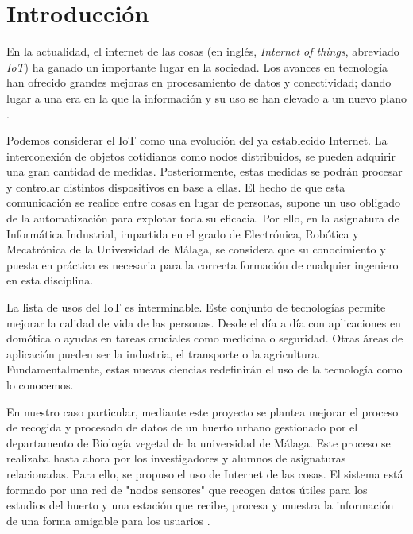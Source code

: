 \section{Introducción}\label{sec:introduccion}
En la actualidad, el internet de las cosas (en inglés, \textit{Internet of things}, abreviado \textit{IoT}) ha ganado un importante lugar en la sociedad. Los avances en tecnología han ofrecido grandes mejoras en procesamiento de datos y conectividad; dando lugar a una era en la que la información y su uso se han elevado a un nuevo plano \parencite{cisco:idc}.

Podemos considerar el IoT como una evolución del ya establecido Internet. La interconexión de objetos cotidianos como nodos distribuidos, se pueden adquirir una gran cantidad de medidas. Posteriormente, estas medidas se podrán procesar y controlar distintos dispositivos en base a ellas. El hecho de que esta comunicación se realice entre cosas en lugar de personas, supone un uso obligado de la automatización para explotar toda su eficacia. Por ello, en la asignatura de Informática Industrial, impartida en el grado de Electrónica, Robótica y Mecatrónica de la Universidad de Málaga, se considera que su conocimiento y puesta en práctica es necesaria para la correcta formación de cualquier ingeniero en esta disciplina.

La lista de usos del IoT es interminable. Este conjunto de tecnologías permite mejorar la calidad de vida de las personas. Desde el día a día con aplicaciones en domótica o ayudas en tareas cruciales como medicina o seguridad. Otras áreas de aplicación pueden ser la industria, el transporte o la agricultura. Fundamentalmente, estas nuevas ciencias redefinirán el uso de la tecnología como lo conocemos.

En nuestro caso particular, mediante este proyecto se plantea mejorar el proceso de recogida y procesado de datos de un huerto urbano gestionado por el departamento de Biología vegetal de la universidad de Málaga. Este proceso se realizaba hasta ahora por los investigadores y alumnos de asignaturas relacionadas. Para ello, se propuso el uso de Internet de las cosas. El sistema está formado por una red de "nodos sensores" que recogen datos útiles para los estudios del huerto y una estación que recibe, procesa y muestra la información de una forma amigable para los usuarios \parencite{uma:enunciado}. 